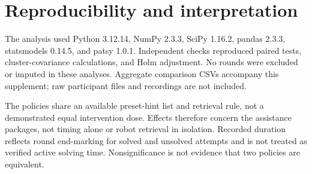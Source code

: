 \documentclass[sigconf,anonymous]{aamas}
\begin{document}
\section{Reproducibility and interpretation}
The analysis used Python 3.12.14, NumPy 2.3.3, SciPy 1.16.2, pandas 2.3.3, statsmodels 0.14.5, and patsy 1.0.1. Independent checks reproduced paired tests, cluster-covariance calculations, and Holm adjustment. No rounds were excluded or imputed in these analyses. Aggregate comparison CSVs accompany this supplement; raw participant files and recordings are not included.

The policies share an available preset-hint list and retrieval rule, not a demonstrated equal intervention dose. Effects therefore concern the assistance packages, not timing alone or robot retrieval in isolation. Recorded duration reflects round end-marking for solved and unsolved attempts and is not treated as verified active solving time. Nonsignificance is not evidence that two policies are equivalent.
\end{document}
